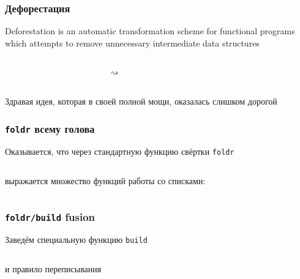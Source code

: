 \documentclass[
    aspectratio=169,
]{beamer}
\begin{document}
\begin{frame}[fragile]
    \frametitle{Дефорестация}

    \begin{definition}
        Deforestation is an automatic transformation scheme for functional programs which attempts to remove unnecessary intermediate data structures
    \end{definition}

    \vspace{1em}
    \begin{columns}
        \begin{column}{0.45\textwidth}
            \inputminted[firstline=33, lastline=36]{haskell}{Code.hs}
        \end{column}
        \begin{column}{0.05\textwidth}
            $\rightsquigarrow$
        \end{column}
        \begin{column}{0.45\textwidth}
            \inputminted[firstline=38, lastline=41]{haskell}{Code.hs}
        \end{column}
    \end{columns}

    \vspace{1em}
    Здравая идея, которая в своей полной мощи, оказалась слишком дорогой

\end{frame}

\begin{frame}[fragile]
    \frametitle{\texttt{foldr} всему голова}

    Оказывается, что через стандартную функцию свёртки \texttt{foldr}
    \inputminted[firstline=43, lastline=45]{haskell}{Code.hs}
    выражается множество функций работы со списками:
    \inputminted[firstline=47, lastline=51]{haskell}{Code.hs}


\end{frame}

\begin{frame}[fragile]
    \frametitle{\texttt{foldr/build} fusion}

    Заведём специальную функцию \texttt{build}
    \inputminted[firstline=53, lastline=54]{haskell}{Code.hs}
    и правило переписывания
    \inputminted[firstline=56, lastline=59]{text}{Code.hs}
\end{frame}
\end{document}
